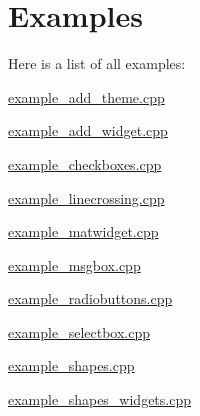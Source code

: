 \section{Examples}
Here is a list of all examples\+:\begin{DoxyCompactItemize}
\item 
\hyperlink{example_add_theme_8cpp-example}{example\+\_\+add\+\_\+theme.\+cpp}
\item 
\hyperlink{example_add_widget_8cpp-example}{example\+\_\+add\+\_\+widget.\+cpp}
\item 
\hyperlink{example_checkboxes_8cpp-example}{example\+\_\+checkboxes.\+cpp}
\item 
\hyperlink{example_linecrossing_8cpp-example}{example\+\_\+linecrossing.\+cpp}
\item 
\hyperlink{example_matwidget_8cpp-example}{example\+\_\+matwidget.\+cpp}
\item 
\hyperlink{example_msgbox_8cpp-example}{example\+\_\+msgbox.\+cpp}
\item 
\hyperlink{example_radiobuttons_8cpp-example}{example\+\_\+radiobuttons.\+cpp}
\item 
\hyperlink{example_selectbox_8cpp-example}{example\+\_\+selectbox.\+cpp}
\item 
\hyperlink{example_shapes_8cpp-example}{example\+\_\+shapes.\+cpp}
\item 
\hyperlink{example_shapes_widgets_8cpp-example}{example\+\_\+shapes\+\_\+widgets.\+cpp}
\end{DoxyCompactItemize}
